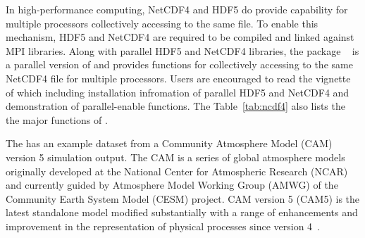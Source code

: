 In high-performance computing, NetCDF4 and HDF5 do provide capability for
multiple processors collectively accessing to the same file. To enable this
mechanism, HDF5 and NetCDF4 are required to be compiled and linked against
MPI libraries. Along with parallel HDF5 and NetCDF4 libraries,
the  package
~\citep{Patel2013pbdNCDF4package} is a parallel version of
 and provides functions for collectively accessing to the same
NetCDF4 file for multiple processors. Users are encouraged to read the
vignette~\citep{Patel2013pbdNCDF4vignette} of  which
including installation infromation of parallel HDF5 and NetCDF4 and
demonstration of parallel-enable functions.
The Table~\ref{tab:ncdf4} also lists the the major functions of
.

The  has an example dataset  from a
Community Atmosphere Model (CAM) version 5 simulation output.
The CAM is a series of
global atmosphere models originally developed at the National Center
for Atmospheric Research (NCAR) and currently guided by Atmosphere
Model Working Group (AMWG) of the Community Earth System Model (CESM)
project. CAM version 5 (CAM5) is the latest standalone model modified
substantially with a range of enhancements and improvement in the
representation of physical processes since version
4~\citep{CAM5,CESM1}.

